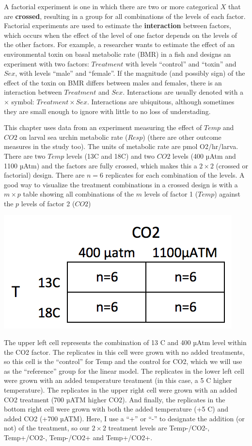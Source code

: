 \documentclass[]{book}
\begin{document}
A factorial experiment is one in which there are two or more categorical
\(X\) that are \textbf{crossed}, resulting in a group for all
combinations of the levels of each factor. Factorial experiments are
used to estimate the \textbf{interaction} between factors, which occurs
when the effect of the level of one factor depends on the levels of the
other factors. For example, a researcher wants to estimate the effect of
an environmental toxin on basal metabolic rate (BMR) in a fish and
designs an experiment with two factors: \(Treatment\) with levels
``control'' and ``toxin'' and \(Sex\), with levels ``male'' and
``female''. If the magnitude (and possibly sign) of the effect of the
toxin on BMR differs between males and females, there is an interaction
between \(Treatment\) and \(Sex\). Interactions are usually denoted with
a \(\times\) symbol: \(Treatment \times Sex\). Interactions are
ubiquitous, although sometimes they are small enough to ignore with
little to no loss of understading.

This chapter uses data from an experiment measuring the effect of
\(Temp\) and \(CO2\) on larval sea urchin metabolic rate (\(Resp\))
(there are other outcome measures in the study too). The units of
metabolic rate are pmol O2/hr/larva. There are two \(Temp\) levels (13C
and 18C) and two \(CO2\) levels (400 µAtm and 1100 µAtm) and the factors
are fully crossed, which makes this a \(2 \times 2\) (crossed or
factorial) design. There are \(n=6\) replicates for each combination of
the levels. A good way to visualize the treatment combinations in a
crossed design is with a \(m \times p\) table showing all combinations
of the \(m\) levels of factor 1 (\(Temp\)) against the \(p\) levels of
factor 2 (\(CO2\))

\includegraphics{images/2x2_table.png}

The upper left cell represents the combination of 13 C and 400 µAtm
level within the CO2 factor. The replicates in this cell were grown with
no added treatments, so this cell is the ``control'' for Temp and the
control for CO2, which we will use as the ``reference'' group for the
linear model. The replicates in the lower left cell were grown with an
added temperature treatment (in this case, a 5 C higher temperature).
The replicates in the upper right cell were grown with an added CO2
treatment (700 µATM higher CO2). And finally, the replicates in the
bottom right cell were grown with both the added temperature (+5 C) and
added CO2 (+700 µATM). Here, I use a ``+'' or ``-'' to designate the
addition (or not) of the treatment, so our \(2 \times 2\) treatment
levels are Temp-/CO2-, Temp+/CO2-, Temp-/CO2+ and Temp+/CO2+.
\end{document}
